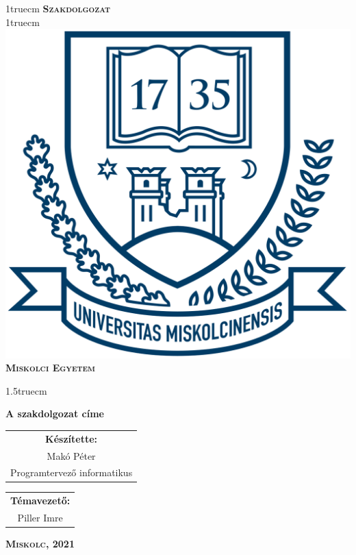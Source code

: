 \pagestyle{empty} %

{\large
\begin{center}
\vglue 1truecm
\textbf{\huge\textsc{Szakdolgozat}}\\
\vglue 1truecm
\includegraphics[width=4.8truecm, height=4truecm]{images/me_logo.png}\\
\textbf{\textsc{Miskolci Egyetem}}
\end{center}}

\vglue 1.5truecm %

{\LARGE
\begin{center}
\textbf{A szakdolgozat címe}
\end{center}}

\vspace*{2.5truecm}
{\large
\begin{center}
\begin{tabular}{c}
\textbf{Készítette:}\\
Makó Péter\\
Programtervező informatikus
\end{tabular}
\end{center}
\begin{center}
\begin{tabular}{c}
\textbf{Témavezető:}\\
Piller Imre
\end{tabular}
\end{center}}
\vfill
{\large
\begin{center}
\textbf{\textsc{Miskolc, 2021}}
\end{center}}

\newpage
